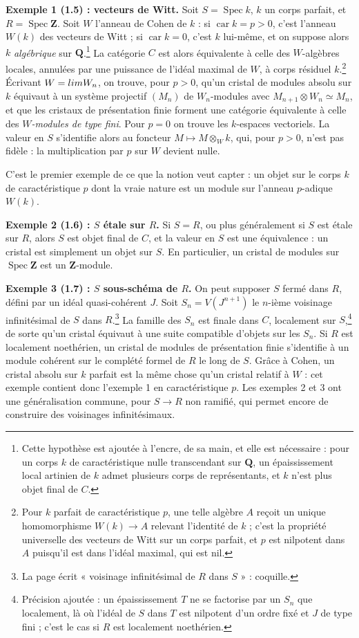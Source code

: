 \documentclass[11pt,a4paper]{article}
\begin{document}
\textbf{Exemple 1 (1.5) : vecteurs de Witt.} Soit $S = \operatorname{Spec}k$,
$k$ un corps parfait, et $R = \operatorname{Spec}\mathbf{Z}$. Soit $W$ l'anneau
de Cohen de $k$ : si $\operatorname{car}k = p > 0$, c'est l'anneau $W(k)$ des
vecteurs de Witt ; si $\operatorname{car}k = 0$, c'est $k$ lui-même, et on
suppose alors $k$ \emph{algébrique} sur $\mathbf{Q}$.\footnote{Cette hypothèse
est ajoutée à l'encre, de sa main, et elle est nécessaire : pour un corps
$k$ de caractéristique nulle transcendant sur $\mathbf{Q}$, un épaississement
local artinien de $k$ admet plusieurs corps de représentants, et $k$ n'est
plus objet final de $C$.} La catégorie $C$ est alors équivalente à celle des
$W$-algèbres locales, annulées par une puissance de l'idéal maximal de $W$, à
corps résiduel $k$.\footnote{Pour $k$ parfait de caractéristique $p$, une telle
algèbre $A$ reçoit un unique homomorphisme $W(k) \to A$ relevant
l'identité de $k$ ; c'est la propriété universelle des vecteurs de Witt sur un
corps parfait, et $p$ est nilpotent dans $A$ puisqu'il est dans l'idéal
maximal, qui est nil.} Écrivant $W = \varprojlim W_n$, on trouve, pour
$p > 0$, qu'un cristal de modules absolu sur $k$ équivaut à un système
projectif $(M_n)$ de $W_n$-modules avec $M_{n+1} \otimes W_n \simeq M_n$, et
que les cristaux de présentation finie forment une catégorie équivalente à
celle des \emph{$W$-modules de type fini}. Pour $p = 0$ on trouve les
$k$-espaces vectoriels. La valeur en $S$ s'identifie alors au foncteur
$M \mapsto M \otimes_W k$, qui, pour $p > 0$, n'est pas fidèle : la
multiplication par $p$ sur $W$ devient nulle.

C'est le premier exemple de ce que la notion veut capter : un objet sur le
corps $k$ de caractéristique $p$ dont la vraie nature est un module sur
l'anneau $p$-adique $W(k)$.

\textbf{Exemple 2 (1.6) : $S$ étale sur $R$.} Si $S = R$, ou plus généralement
si $S$ est étale sur $R$, alors $S$ est objet final de $C$, et la valeur en
$S$ est une équivalence : un cristal est simplement un objet sur $S$. En
particulier, un cristal de modules sur $\operatorname{Spec}\mathbf{Z}$ est un
$\mathbf{Z}$-module.

\textbf{Exemple 3 (1.7) : $S$ sous-schéma de $R$.} On peut supposer $S$ fermé
dans $R$, défini par un idéal quasi-cohérent $J$. Soit $S_n = V(J^{n+1})$ le
$n$-ième voisinage infinitésimal de $S$ dans $R$.\footnote{La page écrit
« voisinage infinitésimal de $R$ dans $S$ » : coquille.} La famille des $S_n$
est finale dans $C$, localement sur $S$,\footnote{Précision ajoutée : un
épaississement $T$ ne se factorise par un $S_n$ que localement, là où l'idéal
de $S$ dans $T$ est nilpotent d'un ordre fixé et $J$ de type fini ; c'est le
cas si $R$ est localement noethérien.} de sorte qu'un cristal équivaut à une
suite compatible d'objets sur les $S_n$. Si $R$ est localement noethérien, un
cristal de modules de présentation finie s'identifie à un module cohérent sur
le complété formel de $R$ le long de $S$. Grâce à Cohen, un cristal absolu
sur $k$ parfait est la même chose qu'un cristal relatif à $W$ : cet exemple
contient donc l'exemple 1 en caractéristique $p$. Les exemples 2 et 3 ont une
généralisation commune, pour $S \to R$ non ramifié, qui permet encore de
construire des voisinages infinitésimaux.
\end{document}
